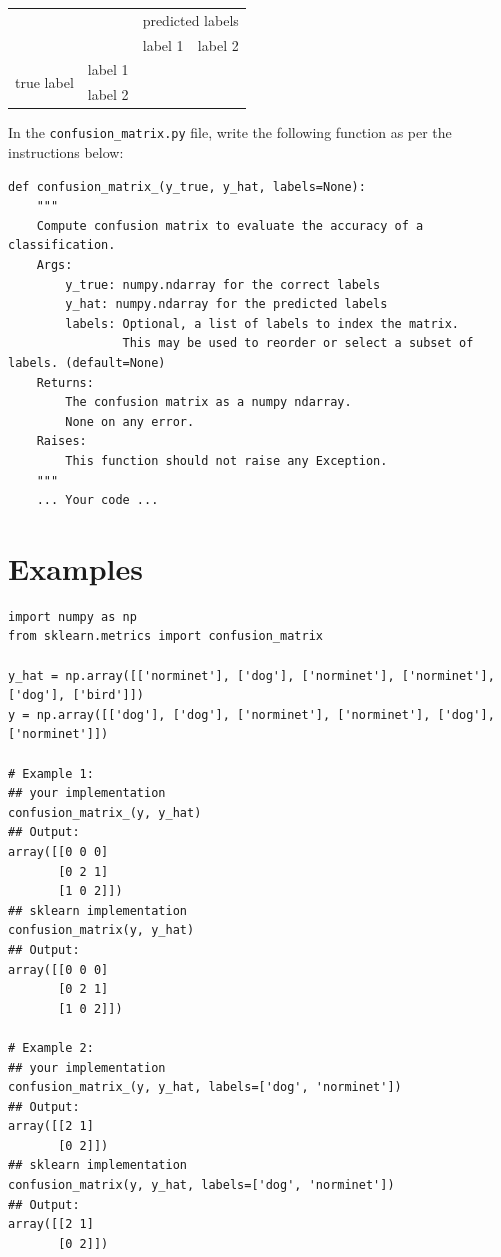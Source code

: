 \documentclass{42-en}
\begin{document}
\begin{center}
  \begin{tabular}{|c|c|c|c|}
    \cline{3-4}
    \multicolumn{2}{c|}{\multirow{2}{*}{}}  & \multicolumn{2}{|c|}{predicted labels} \\ \cline{3-4}
    \multicolumn{2}{c|}{}       & label 1 & label 2 \\
    \hline
    \multirow{2}{*}{true label} & label 1 &         &         \\
    \cline{2-4}
                                & label 2 &         &         \\
    \hline
  \end{tabular}
\end{center}

In the \texttt{confusion\_matrix.py} file, write the following function as per the instructions below:

\begin{verbatim}
def confusion_matrix_(y_true, y_hat, labels=None):
    """
    Compute confusion matrix to evaluate the accuracy of a classification.
    Args:
        y_true: numpy.ndarray for the correct labels
        y_hat: numpy.ndarray for the predicted labels
        labels: Optional, a list of labels to index the matrix.
                This may be used to reorder or select a subset of labels. (default=None)
    Returns: 
        The confusion matrix as a numpy ndarray.
        None on any error.
    Raises:
        This function should not raise any Exception.
    """
    ... Your code ...
\end{verbatim}


\section*{Examples}
\begin{verbatim}
import numpy as np
from sklearn.metrics import confusion_matrix

y_hat = np.array([['norminet'], ['dog'], ['norminet'], ['norminet'], ['dog'], ['bird']])
y = np.array([['dog'], ['dog'], ['norminet'], ['norminet'], ['dog'], ['norminet']])

# Example 1: 
## your implementation
confusion_matrix_(y, y_hat)
## Output:
array([[0 0 0]
       [0 2 1]
       [1 0 2]])
## sklearn implementation
confusion_matrix(y, y_hat)
## Output:
array([[0 0 0]
       [0 2 1]
       [1 0 2]])

# Example 2:
## your implementation
confusion_matrix_(y, y_hat, labels=['dog', 'norminet'])
## Output:
array([[2 1]
       [0 2]])
## sklearn implementation
confusion_matrix(y, y_hat, labels=['dog', 'norminet'])
## Output:
array([[2 1]
       [0 2]])
\end{verbatim}
\end{document}
